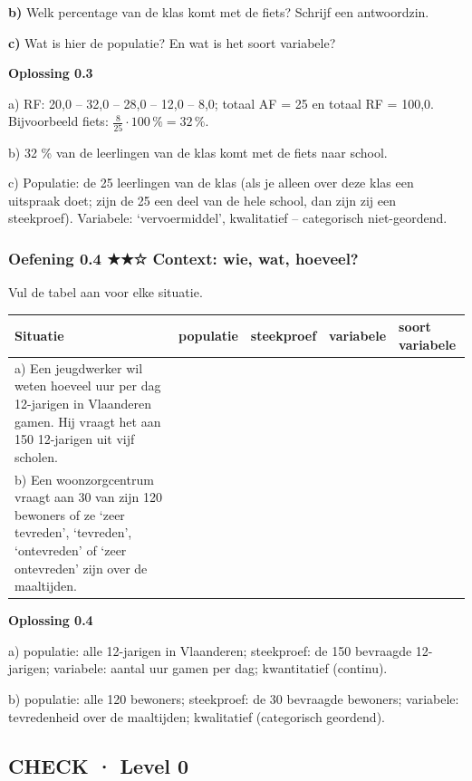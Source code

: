\textbf{b)} Welk percentage van de klas komt met de fiets? Schrijf een antwoordzin. \lijn

\textbf{c)} Wat is hier de populatie? En wat is het soort variabele? \lijn

\begin{oplossing}
\textbf{Oplossing 0.3}

a) RF: 20,0 – 32,0 – 28,0 – 12,0 – 8,0; totaal AF = 25 en totaal RF = 100,0. Bijvoorbeeld fiets: $\frac{8}{25}\cdot 100\,\% = 32\,\%$.

b) 32 \% van de leerlingen van de klas komt met de fiets naar school.

c) Populatie: de 25 leerlingen van de klas (als je alleen over deze klas een uitspraak doet; zijn de 25 een deel van de hele school, dan zijn zij een steekproef). Variabele: ‘vervoermiddel’, kwalitatief – categorisch niet-geordend.
\end{oplossing}

\subsubsection*{Oefening 0.4 \quad ★★☆ \quad Context: wie, wat, hoeveel?}

Vul de tabel aan voor elke situatie.

\begin{tabular}{lllll}
\hline
Situatie & populatie & steekproef & variabele & soort variabele \\
\hline
a) Een jeugdwerker wil weten hoeveel uur per dag 12-jarigen in Vlaanderen gamen. Hij vraagt het aan 150 12-jarigen uit vijf scholen. & & & & \\
b) Een woonzorgcentrum vraagt aan 30 van zijn 120 bewoners of ze ‘zeer tevreden’, ‘tevreden’, ‘ontevreden’ of ‘zeer ontevreden’ zijn over de maaltijden. & & & & \\
\hline
\end{tabular}

\begin{oplossing}
\textbf{Oplossing 0.4}

a) populatie: alle 12-jarigen in Vlaanderen; steekproef: de 150 bevraagde 12-jarigen; variabele: aantal uur gamen per dag; kwantitatief (continu).

b) populatie: alle 120 bewoners; steekproef: de 30 bevraagde bewoners; variabele: tevredenheid over de maaltijden; kwalitatief (categorisch geordend).
\end{oplossing}

\subsection*{CHECK · Level 0}

